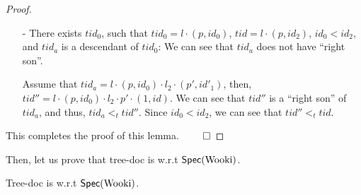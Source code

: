 \begin {proof}
\begin{itemize}
\begin{itemize}
    Let $tid'' = l \cdot (p,id_1) \cdot (1,id)$. Since $tid''$ is a ``right son'' of $tid_a$, we can see that $tid_a <_t tid''$. Since $id_1 < id_2$, we can see that $tid'' <_t tid$.

    \item[-] There exists $tid_0$, such that $tid_0 = l \cdot (p,id_0)$, $tid = l \cdot (p,id_2)$, $id_0 < id_2$, and $tid_a$ is a descendant of $tid_0$: We can see that $tid_a$ does not have ``right son''.

    Assume that $tid_a = l \cdot (p,id_0) \cdot l_2 \cdot (p',id'_1)$, then, $tid'' = l \cdot (p,id_0) \cdot l_2 \cdot p' \cdot (1,id)$. We can see that $tid''$ is a ``right son'' of $tid_a$, and thus, $tid_a <_t tid''$. Since $id_0 < id_2$, we can see that $tid'' <_t tid$.
    \end{itemize}

\end{itemize}

This completes the proof of this lemma. $\qed$
\end {proof}


Then, let us prove that tree-doc is \crdtlinearizable{} w.r.t $\mathsf{Spec}(\text{Wooki})$.

\begin{lemma}
\label{lemma:tree-doc is correct}
Tree-doc is \crdtlinearizable{} w.r.t $\mathsf{Spec}(\text{Wooki})$.
\end{lemma}


